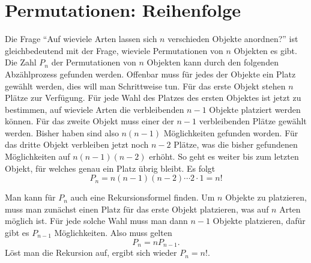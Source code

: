 \section{Permutationen: Reihenfolge}
\label{kombinatorik-permutation}
Die Frage ``Auf wieviele Arten lassen sich $n$ verschieden Objekte anordnen?''
ist gleichbedeutend mit der Frage, wieviele Permutationen von $n$
Objekten es gibt.
Die Zahl  $P_n$ der Permutationen von $n$ Objekten
kann durch den folgenden Abzählprozess gefunden werden.
Offenbar muss für jedes der Objekte ein Platz gewählt werden, dies will
man Schrittweise tun.
Für das erste Objekt stehen $n$ Plätze
zur Verfügung.
Für jede Wahl des Platzes des ersten Objektes 
ist jetzt zu bestimmen, auf wieviele Arten die verbleibenden
$n-1$ Objekte platziert werden können.
Für das zweite
Objekt muss einer der $n-1$ verbleibenden Plätze gewählt werden.
Bisher haben sind also $n(n-1)$ Möglichkeiten gefunden worden.
Für das dritte Objekt verbleiben jetzt noch $n-2$ Plätze,
was die bisher gefundenen Möglichkeiten auf $n(n-1)(n-2)$
erhöht.
So geht es weiter bis zum letzten Objekt, für welches
genau ein Platz übrig bleibt.
Es folgt
\[
P_n=n(n-1)(n-2)\dotsm 2\cdot 1=n!
\]

Man kann für $P_n$ auch eine Rekursionsformel finden.
Um $n$ Objekte
zu platzieren, muss man zunächst einen Platz für das erste Objekt
platzieren, was auf $n$ Arten möglich ist.
Für jede solche Wahl
muss man dann $n-1$ Objekte platzieren, dafür gibt es $P_{n-1}$
Möglichkeiten.
Also muss gelten
\[
P_n=nP_{n-1}.
\]
Löst man die Rekursion auf, ergibt sich wieder $P_n=n!$.


